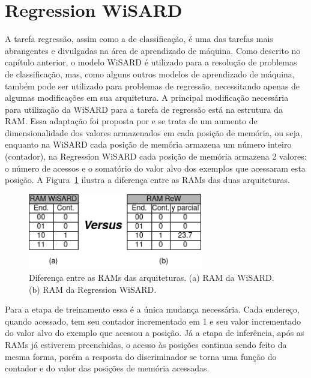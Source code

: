 \section{Regression WiSARD}
A tarefa regressão, assim como a de classificação, é uma das tarefas mais abrangentes e divulgadas na área de aprendizado de máquina. Como descrito no capítulo anterior, o modelo WiSARD é utilizado para a resolução de problemas de classificação, mas, como alguns outros modelos de aprendizado de máquina, também pode ser utilizado para problemas de regressão, necessitando apenas de algumas modificações em sua arquitetura.
A principal modificação necessária para utilização da WiSARD para a tarefa de regressão está na estrutura da RAM. Essa adaptação foi proposta por \cite{rew} e se trata de um aumento de dimensionalidade dos valores armazenados em cada posição de memória, ou seja, enquanto na WiSARD cada posição de memória armazena um número inteiro (contador), na Regression WiSARD cada posição de memória armazena 2 valores: o número de acessos e o somatório do valor alvo dos exemplos que acessaram esta posição. A Figura~\ref{fig:ramxram} ilustra a diferença entre as RAMs das duas arquiteturas.

\hspace*{-1.5in}
\begin{figure}[!ht] \label{fig:ramxram}
    \centering
    \includegraphics[width=3.0in]{img/ramxram.png}
    \caption{Diferença entre as RAMs das arquiteturas. (a) RAM da WiSARD. (b) RAM da Regression WiSARD.}
\end{figure}

Para a etapa de treinamento essa é a única mudança necessária. Cada endereço, quando acessado, tem seu contador incrementado em 1 e seu valor incrementado do valor alvo do exemplo que acessou a posição. Já a etapa de inferência, após as RAMs já estiverem preenchidas, o acesso às posições continua sendo feito da mesma forma, porém a resposta do discriminador se torna uma função do contador e do valor das posições de memória acessadas.

